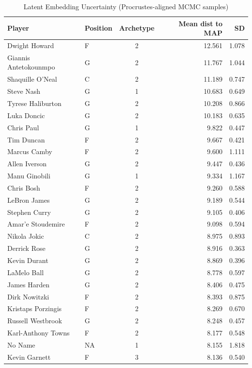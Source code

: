 \begin{table}[t]
\caption*{
{\fontsize{20}{25}\selectfont  Latent Embedding Uncertainty (Procrustes-aligned MCMC samples)\fontsize{12}{15}\selectfont }
} 
\fontsize{12.0pt}{14.0pt}\selectfont
\begin{tabular*}{\linewidth}{@{\extracolsep{\fill}}llcrr}
\toprule
Player & Position & Archetype & Mean dist to MAP & SD \\ 
\midrule\addlinespace[2.5pt]
Dwight Howard & F & 2 & 12.561 & 1.078 \\ 
Giannis Antetokounmpo & G & 2 & 11.767 & 1.044 \\ 
Shaquille O'Neal & C & 2 & 11.189 & 0.747 \\ 
Steve Nash & G & 1 & 10.683 & 0.649 \\ 
Tyrese Haliburton & G & 2 & 10.208 & 0.866 \\ 
Luka Doncic & G & 2 & 10.183 & 0.635 \\ 
Chris Paul & G & 1 & 9.822 & 0.447 \\ 
Tim Duncan & F & 2 & 9.667 & 0.421 \\ 
Marcus Camby & F & 2 & 9.600 & 1.111 \\ 
Allen Iverson & G & 2 & 9.447 & 0.436 \\ 
Manu Ginobili & G & 1 & 9.334 & 1.167 \\ 
Chris Bosh & F & 2 & 9.260 & 0.588 \\ 
LeBron James & G & 2 & 9.189 & 0.544 \\ 
Stephen Curry & G & 2 & 9.105 & 0.406 \\ 
Amar'e Stoudemire & F & 2 & 9.098 & 0.594 \\ 
Nikola Jokic & C & 2 & 8.975 & 0.893 \\ 
Derrick Rose & G & 2 & 8.916 & 0.363 \\ 
Kevin Durant & G & 2 & 8.869 & 0.396 \\ 
LaMelo Ball & G & 2 & 8.778 & 0.597 \\ 
James Harden & G & 2 & 8.406 & 0.475 \\ 
Dirk Nowitzki & F & 2 & 8.393 & 0.875 \\ 
Kristaps Porzingis & F & 2 & 8.269 & 0.670 \\ 
Russell Westbrook & G & 2 & 8.248 & 0.457 \\ 
Karl-Anthony Towns & F & 2 & 8.177 & 0.548 \\ 
No Name & NA & 1 & 8.155 & 1.818 \\ 
Kevin Garnett & F & 3 & 8.136 & 0.540 \\ 

\end{tabular*}
\end{table}
